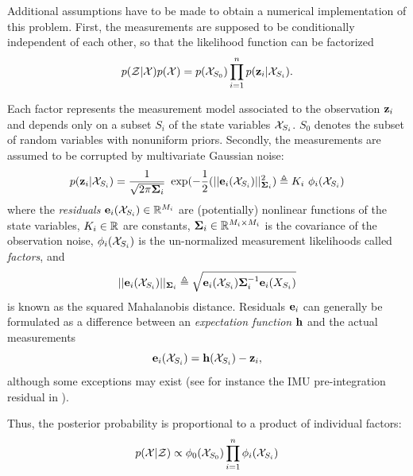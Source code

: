 Additional assumptions have to be made to obtain a numerical implementation of this problem.
First, the measurements are supposed to be conditionally independent of each other, so that the likelihood function can be factorized 
%
\begin{equation}
    p(\mathcal{Z} | \mathcal{X}) p(\mathcal{X}) =  p(\mathcal{X}_{S_0}) \prod_{i=1}^{n} p({\bf z}_i | \mathcal{X}_{S_i}).
\end{equation}

Each factor represents the measurement model associated to the  observation ${\bf z}_i$ and depends only on a subset $S_i$ of the state variables $\mathcal{X}_{S_i}$. 
$S_0$ denotes the subset of random variables with nonuniform priors.
Secondly, the measurements are assumed to be corrupted by multivariate Gaussian noise:
%
\begin{equation}
    p({\bf z}_i | \mathcal{X}_{S_i}) = \frac{1}{\sqrt{2\pi{\bm \Sigma}_i}} ~ \exp(- \frac{1}{2} (||{\bf e}_i(\mathcal{X}_{S_i})||^2_{{\bm \Sigma}_i}) \triangleq K_i~\phi_i(\mathcal{X}_{S_i})
\end{equation}
%
where the \textit{residuals} ${\bf e}_i(\mathcal{X}_{S_i}) \in \mathbb{R}^{M_i}$ are (potentially) nonlinear functions of the state variables, $K_i \in \mathbb{R}$ are constants, 
${\bm \Sigma}_i \in \mathbb{R}^{M_i \times M_i}$ is the covariance of the observation noise,
$\phi_i(\mathcal{X}_{S_i})$ is the un-normalized measurement likelihoods called \textit{factors}, and 
%
\begin{equation*}
    ||{\bf e}_i(\mathcal{X}_{S_i})||_{{\bm \Sigma}_i} \triangleq \sqrt{{\bf e}_i(\mathcal{X}_{S_i}) {\bm \Sigma}_i^{-1} {\bf e}_i(X_{S_i})}
\end{equation*}
%
is known as the squared Mahalanobis distance. 
Residuals ${\bf e}_i$ can generally be formulated as a difference between an \textit{expectation function} ${\bf h}$ and the actual measurements
%
\begin{equation}
    {\bf e}_i(\mathcal{X}_{S_i}) = {\bf h}(\mathcal{X}_{S_i}) - {\bf z}_i,
    \label{eq:error_expectation}
\end{equation}
%
although some exceptions may exist (see for instance the IMU pre-integration residual  in ).

Thus, the posterior probability is proportional to a product of individual factors:
%
\begin{equation}
    p(\mathcal{X} | \mathcal{Z}) \propto \phi_0(\mathcal{X}_{S_0}) \prod_{i=1}^{n} \phi_i(\mathcal{X}_{S_i}) 
    \label{eq:likelihood_factorization}
\end{equation}


